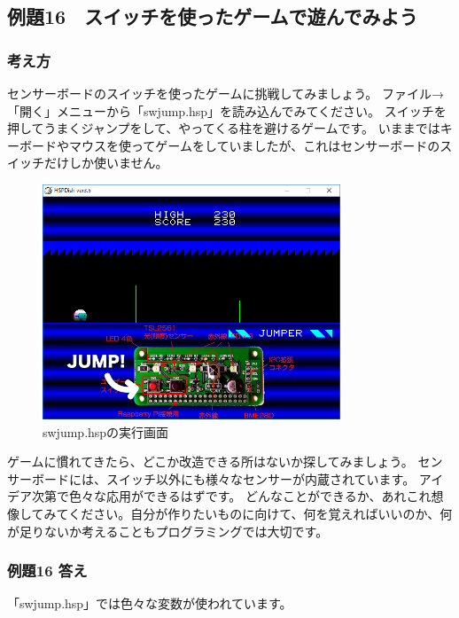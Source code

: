 \clearpage
\subsection{例題16　スイッチを使ったゲームで遊んでみよう}

\subsubsection*{考え方}

センサーボードのスイッチを使ったゲームに挑戦してみましょう。
ファイル→「開く」メニューから「swjump.hsp」を読み込んでみてください。
スイッチを押してうまくジャンプをして、やってくる柱を避けるゲームです。
いままではキーボードやマウスを使ってゲームをしていましたが、これはセンサーボードのスイッチだけしか使いません。

\begin{figure}[H]
    \begin{center}
        \includegraphics[keepaspectratio,width=8.881cm,height=7.011cm]{text02-img/text02-img054.png}
        \caption{swjump.hspの実行画面}
    \end{center}
\end{figure}

ゲームに慣れてきたら、どこか改造できる所はないか探してみましょう。
センサーボードには、スイッチ以外にも様々なセンサーが内蔵されています。
アイデア次第で色々な応用ができるはずです。
どんなことができるか、あれこれ想像してみてください。自分が作りたいものに向けて、何を覚えればいいのか、何が足りないか考えることもプログラミングでは大切です。

\subsubsection*{例題16 答え}

「swjump.hsp」では色々な変数が使われています。

